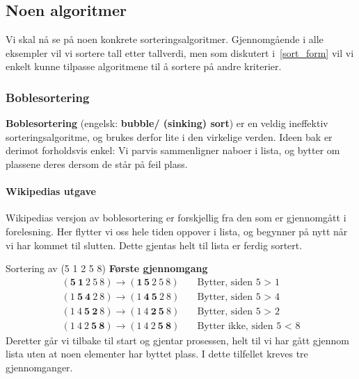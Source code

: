 \subsection{Noen algoritmer}
Vi skal nå se på noen konkrete sorteringsalgoritmer. Gjennomgående i alle
eksempler vil vi sortere tall etter tallverdi, men som diskutert i~\ref{sort_form} vil vi enkelt kunne tilpasse algoritmene til å sortere på andre kriterier. 


\subsubsection{Boblesortering}
\label{bubblesort}
\textbf{Boblesortering} (engelsk: \textbf{bubble/ (sinking) sort})  er en veldig ineffektiv sorteringsalgoritme, og brukes derfor lite i den virkelige verden. 
Ideen bak er derimot forholdsvis enkel:
Vi parvis sammenligner naboer i lista, og bytter om plassene deres dersom de står på feil plass.

\paragraph*{Wikipedias utgave}\label{sec:bubble-wiki}
Wikipedias versjon av boblesortering er forskjellig fra den som er gjennomgått i forelesning.
Her flytter vi oss hele tiden oppover i lista, og begynner på nytt når vi har kommet til slutten.
Dette gjentas helt til lista er ferdig sortert.

\begin{example} Sortering av (5 1 2 5 8) \newline
  \textbf{Første gjennomgang}
  \begin{align*}
    (\mathbf{5}~ \mathbf{1}~ 2~ 5~ 8) \rightarrow (\mathbf{1}\, \mathbf{5} ~ 2 ~ 5 ~ 8) &\quad \text{Bytter, siden 5 > 1} \\
    (1~ \mathbf{5}~ \mathbf{4}~ 2~ 8) \rightarrow (1 ~ \mathbf{4} ~ \mathbf{5} ~ 2 ~ 8) &\quad \text{Bytter, siden 5 > 4} \\
    (1~ 4~ \mathbf{5}~ \mathbf{2}~ 8) \rightarrow (1~ 4~ \mathbf{2}~ \mathbf{5}~ 8)     &\quad \text{Bytter, siden 5 > 2} \\
    (1~ 4~ 2~ \mathbf{5}~ \mathbf{8}) \rightarrow (1~ 4~ 2~ \mathbf{5}~ \mathbf{8})     &\quad \text{Bytter ikke, siden 5 < 8}
  \end{align*}
  Deretter går vi tilbake til start og gjentar prosessen, helt til vi har gått gjennom lista uten at noen elementer har byttet plass.
  I dette tilfellet kreves tre gjennomganger.
\end{example}

